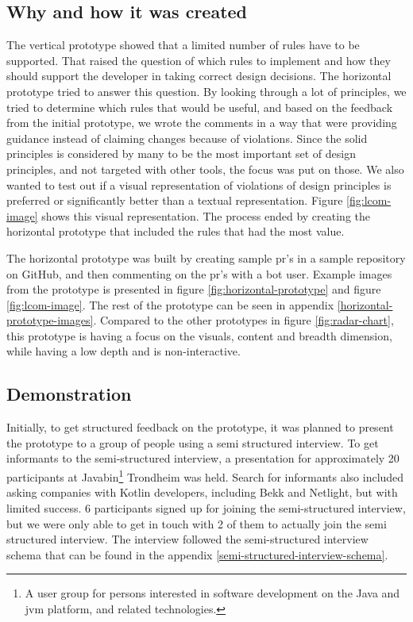 \documentclass[pdftex,10pt,b5paper,twoside]{report}
\begin{document}
\subsection*{Why and how it was created}
The vertical prototype showed that a limited number of rules have to be supported. That raised the question of which rules to implement and how they should support the developer in taking correct design decisions. The horizontal prototype tried to answer this question. By looking through a lot of principles, we tried to determine which rules that would be useful, and based on the feedback from the initial prototype, we wrote the comments in a way that were providing guidance instead of claiming changes because of violations. Since the \gls{solid} principles is considered by many to be the most important set of design principles, and not targeted with other tools, the focus was put on those. We also wanted to test out if a visual representation of violations of design principles is preferred or significantly better than a textual representation. Figure \ref{fig:lcom-image} shows this visual representation. The process ended by creating the horizontal prototype that included the rules that had the most value. 

The horizontal prototype was built by creating sample \gls{pr}'s in a sample repository on GitHub, and then commenting on the \gls{pr}'s with a bot user. Example images from the prototype is presented in figure \ref{fig:horizontal-prototype} and figure \ref{fig:lcom-image}. The rest of the prototype can be seen in appendix \ref{horizontal-prototype-images}. Compared to the other prototypes in figure \ref{fig:radar-chart}, this prototype is having a focus on the visuals, content and breadth dimension, while having a low depth and is non-interactive.

\subsection*{Demonstration}
Initially, to get structured feedback on the prototype, it was planned to present the prototype to a group of people using a semi structured interview. To get informants to the semi-structured interview, a presentation for approximately 20 participants at Javabin\footnote{A user group for persons interested in software development on the Java and \gls{jvm} platform, and related technologies.} Trondheim was held. Search for informants also included asking companies with Kotlin developers, including Bekk and Netlight, but with limited success. 6 participants signed up for joining the semi-structured interview, but we were only able to get in touch with 2 of them to actually join the semi structured interview. The interview followed the semi-structured interview schema that can be found in the appendix \ref{semi-structured-interview-schema}.
\end{document}
